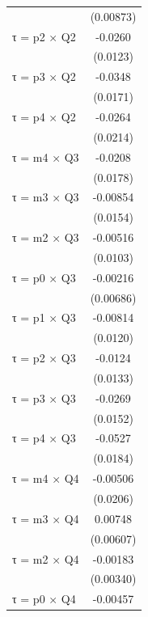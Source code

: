 \begin{table}[htbp]
\begin{tabular}{l*{1}{c}}
                    &   (0.00873)         \\
[1em]
τ = p2 × Q2         &     -0.0260\sym{**} \\
                    &    (0.0123)         \\
[1em]
τ = p3 × Q2         &     -0.0348\sym{**} \\
                    &    (0.0171)         \\
[1em]
τ = p4 × Q2         &     -0.0264         \\
                    &    (0.0214)         \\
[1em]
τ = m4 × Q3         &     -0.0208         \\
                    &    (0.0178)         \\
[1em]
τ = m3 × Q3         &    -0.00854         \\
                    &    (0.0154)         \\
[1em]
τ = m2 × Q3         &    -0.00516         \\
                    &    (0.0103)         \\
[1em]
τ = p0 × Q3         &    -0.00216         \\
                    &   (0.00686)         \\
[1em]
τ = p1 × Q3         &    -0.00814         \\
                    &    (0.0120)         \\
[1em]
τ = p2 × Q3         &     -0.0124         \\
                    &    (0.0133)         \\
[1em]
τ = p3 × Q3         &     -0.0269\sym{*}  \\
                    &    (0.0152)         \\
[1em]
τ = p4 × Q3         &     -0.0527\sym{***}\\
                    &    (0.0184)         \\
[1em]
τ = m4 × Q4         &    -0.00506         \\
                    &    (0.0206)         \\
[1em]
τ = m3 × Q4         &     0.00748         \\
                    &   (0.00607)         \\
[1em]
τ = m2 × Q4         &    -0.00183         \\
                    &   (0.00340)         \\
[1em]
τ = p0 × Q4         &    -0.00457         \\

\end{tabular}
\end{table}
